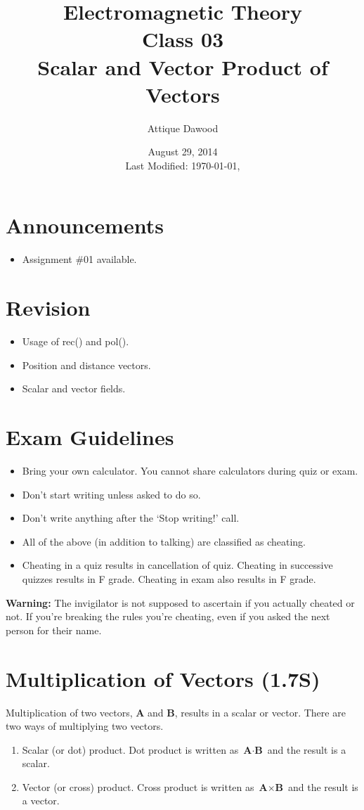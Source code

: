 \documentclass[12pt,a4paper]{article}
\title{Electromagnetic Theory\\Class 03\\Scalar and Vector Product of Vectors}
\author{Attique Dawood}
\date{August 29, 2014\\[0.2cm] Last Modified: \today, \currenttime}
\begin{document}
\maketitle
\section{Announcements}
\begin{itemize}
\item Assignment \#01 available.
\end{itemize}
\section{Revision}
\begin{itemize}
\item Usage of rec() and pol().
\item Position and distance vectors.
\item Scalar and vector fields.
\end{itemize}
\section{Exam Guidelines}
\begin{itemize}
\item Bring your own calculator. You cannot share calculators during quiz or exam.
\item Don't start writing unless asked to do so.
\item Don't write anything after the `Stop writing!' call.
\item All of the above (in addition to talking) are classified as cheating.
\item Cheating in a quiz results in cancellation of quiz. Cheating in successive quizzes results in F grade. Cheating in exam also results in F grade.
\end{itemize}
\textbf{Warning:} The invigilator is not supposed to ascertain if you actually cheated or not. If you're breaking the rules you're cheating, even if you asked the next person for their name.
\section{Multiplication of Vectors (1.7S)}
Multiplication of two vectors, \textbf{A} and \textbf{B}, results in a scalar or vector. There are two ways of multiplying two vectors.
\begin{enumerate}
\item Scalar (or dot) product. Dot product is written as $\textbf{A}\cdot \textbf{B}$ and the result is a scalar.
\item Vector (or cross) product. Cross product is written as $\textbf{A}\times \textbf{B}$ and the result is a vector.
\end{enumerate}
\end{document}
